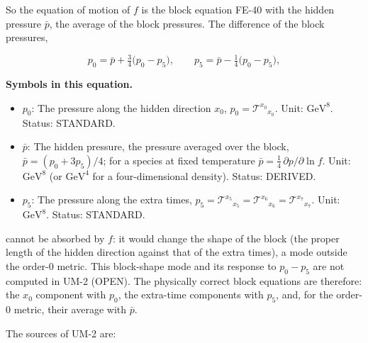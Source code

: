 \documentclass[
  10pt,
]{article}
\providecommand{\tightlist}{%
  \setlength{\itemsep}{0pt}\setlength{\parskip}{0pt}}
\begin{document}
So the equation of motion of \(f\) is the block equation FE-40 with the
hidden pressure \(\bar p\), the average of the block pressures. The
difference of the block pressures,

\[
p_0 = \bar p + \tfrac34\big(p_0 - p_5\big),\qquad p_5 = \bar p - \tfrac14\big(p_0 - p_5\big),
\]

\textbf{Symbols in this equation.}

\begin{itemize}
\tightlist
\item
  \(p_0\): The pressure along the hidden direction \(x_0\),
  \(p_0 = \mathcal{T}^{x_0}{}_{x_0}\). Unit: \(\mathrm{GeV}^{8}\).
  Status: STANDARD.
\item
  \(\bar p\): The hidden pressure, the pressure averaged over the block,
  \(\bar p = (p_0 + 3p_5)/4\); for a species at fixed temperature
  \(\bar p = \frac14\,\partial p/\partial\ln f\). Unit:
  \(\mathrm{GeV}^{8}\) (or \(\mathrm{GeV}^{4}\) for a four-dimensional
  density). Status: DERIVED.
\item
  \(p_5\): The pressure along the extra times,
  \(p_5 = \mathcal{T}^{x_5}{}_{x_5} = \mathcal{T}^{x_6}{}_{x_6} = \mathcal{T}^{x_7}{}_{x_7}\).
  Unit: \(\mathrm{GeV}^{8}\). Status: STANDARD.
\end{itemize}

cannot be absorbed by \(f\): it would change the shape of the block (the
proper length of the hidden direction against that of the extra times),
a mode outside the order-0 metric. This block-shape mode and its
response to \(p_0 - p_5\) are not computed in UM-2 (OPEN). The
physically correct block equations are therefore: the \(x_0\) component
with \(p_0\), the extra-time components with \(p_5\), and, for the
order-0 metric, their average with \(\bar p\).

The sources of UM-2 are:
\end{document}
